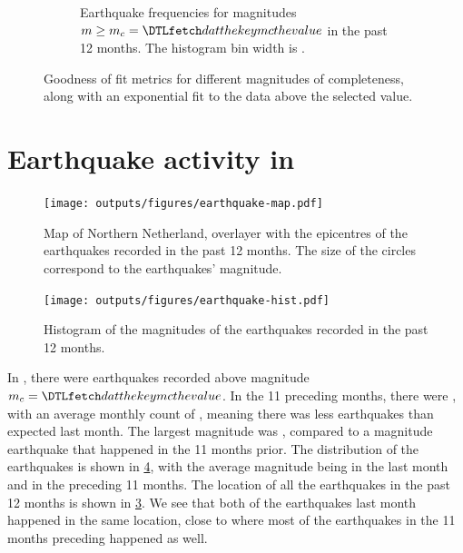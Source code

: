 \documentclass[11pt]{article}
\begin{document}
\begin{figure}[htp]
\begin{subfigure}[b]{0.49\textwidth}
    \caption{Earthquake frequencies for magnitudes $m\geq m_c=\dat{mc}$ in the past 12 months. The histogram bin width is .}
    \label{fig:hist}
\end{subfigure}
\caption{Goodness of fit metrics for different magnitudes of completeness, along with an exponential fit
to the data above the selected value.}
\label{fig:figs1}
\end{figure}

\newpage

\section*{Earthquake activity in }%

\begin{figure}[htp]
\begin{center}
    \texttt{[image: outputs/figures/earthquake-map.pdf]}
\end{center}
\caption{Map of Northern Netherland, overlayer with the epicentres of the earthquakes recorded in the past 12 months.
The size of the circles correspond to the earthquakes' magnitude.}
\label{fig:map}
\end{figure}

\begin{figure}[htp]
\begin{center}
    \texttt{[image: outputs/figures/earthquake-hist.pdf]}
\end{center}
\caption{Histogram of the magnitudes of the earthquakes recorded in the past 12 months.}
\label{fig:hist}
\end{figure}

In , there were  earthquakes recorded above magnitude
$m_c=\dat{mc}$. In the 11 preceding months, there were , with an average monthly
count of , meaning there was less earthquakes than expected last month.
The largest magnitude was , compared to a magnitude  earthquake that
happened in the 11 months prior. The distribution of the earthquakes is shown in \cref{fig:hist}, with the
average magnitude being  in the last month and  in the preceding 11 months.
The location of all the earthquakes in the past 12 months is shown in \cref{fig:map}.
We see that both of the earthquakes last month happened in the same location, close to where most of the earthquakes in the
11 months preceding happened as well.
\end{document}
